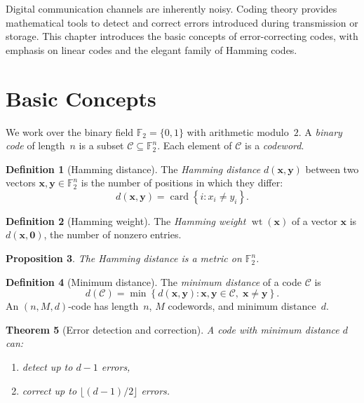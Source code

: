 \documentclass[12pt,a4paper,openany]{book}
\theoremstyle{definition}
\newtheorem{definition}{Definition}[chapter]
\theoremstyle{plain}
\newtheorem{theorem}[definition]{Theorem}
\newtheorem{proposition}[definition]{Proposition}
\theoremstyle{remark}
\newcommand{\set}[1]{\left\{#1\right\}}
\DeclareMathOperator{\card}{card}
\begin{document}
Digital communication channels are inherently noisy.  Coding theory
provides mathematical tools to detect and correct errors introduced
during transmission or storage.  This chapter introduces the basic
concepts of error-correcting codes, with emphasis on linear codes and
the elegant family of Hamming codes.

\section{Basic Concepts}
\label{sec:codes-basic}

We work over the binary field $\mathbb{F}_2=\{0,1\}$ with arithmetic
modulo~$2$.  A \emph{binary code} of length~$n$ is a subset
$\mathcal{C}\subseteq\mathbb{F}_2^n$.  Each element of $\mathcal{C}$
is a \emph{codeword}.

\begin{definition}[Hamming distance]
\label{def:hamming-dist}
The \emph{Hamming distance} $d(\mathbf{x},\mathbf{y})$ between two
vectors $\mathbf{x},\mathbf{y}\in\mathbb{F}_2^n$ is the number of
positions in which they differ:
\[
  d(\mathbf{x},\mathbf{y})
  =\card\set{i:x_i\ne y_i}.
\]
\end{definition}

\begin{definition}[Hamming weight]
\label{def:hamming-weight}
The \emph{Hamming weight} $\operatorname{wt}(\mathbf{x})$ of a vector
$\mathbf{x}$ is $d(\mathbf{x},\mathbf{0})$, the number of nonzero
entries.
\end{definition}

\begin{proposition}
\label{prop:hamming-metric}
The Hamming distance is a metric on $\mathbb{F}_2^n$.
\end{proposition}

\begin{definition}[Minimum distance]
\label{def:min-dist}
The \emph{minimum distance} of a code $\mathcal{C}$ is
\[
  d(\mathcal{C})=\min\set{d(\mathbf{x},\mathbf{y})
    :\mathbf{x},\mathbf{y}\in\mathcal{C},\;\mathbf{x}\ne\mathbf{y}}.
\]
An $(n,M,d)$-code has length~$n$, $M$ codewords, and minimum
distance~$d$.
\end{definition}

\begin{theorem}[Error detection and correction]
\label{thm:error-capability}
A code with minimum distance $d$ can:
\begin{enumerate}
  \item detect up to $d-1$ errors,
  \item correct up to $\lfloor(d-1)/2\rfloor$ errors.
\end{enumerate}
\end{theorem}
\end{document}
